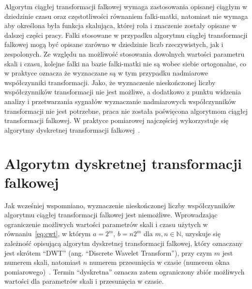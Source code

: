 Algorytm ciągłej transformacji falkowej wymaga zastosowania opisanej ciągłym w dziedzinie czasu oraz częstotliwości równaniem falki-matki, natomiast nie wymaga aby określona była funkcja skalująca, której rola i znaczenie zostały opisane w dalszej części pracy. Falki stosowane w przypadku algorytmu ciągłej transformacji falkowej mogą być opisane zarówno w dziedzinie liczb rzeczywistych, jak i zespolonych. Ze względu na możliwość stosowania dowolnych wartości parametru skali i czasu, kolejne falki na bazie falki-matki nie są wobec siebie ortogonalne, co w praktyce oznacza że wyznaczane są w tym przypadku nadmiarowe współczynniki transformacji. Jako, że wyznaczenie nieskończonej liczby współczynników transformacji nie jest możliwe, a dodatkowo z punktu widzenia analizy i przetwarzania sygnałów wyznaczanie nadmiarowych współczynników transformacji nie jest potrzebne, praca nie została poświęcona algorytmom ciągłej transformacji falkowej. W praktyce pomiarowej najczęściej wykorzystuje się algorytmy dyskretnej transformacji falkowej~\cite{wallen_handbook, akujuobi_applications}.

\section{Algorytm dyskretnej transformacji falkowej}

Jak wcześniej wspomniano, wyznaczenie nieskończonej liczby współczynników algorytmu ciągłej transformacji falkowej jest niemożliwe. Wprowadzając ograniczenie możliwych wartości parametrów skali i czasu użytych w równaniu~\eqref{eq:cwt}, w którym $a = 2^m$, $b = n2^m$ dla $m, n \in \mathbb{N}$, uzyskuje się zależność opisującą algorytm dyskretnej transformacji falkowej, który oznaczany jest skrótem \enquote{DWT} (ang. \enquote{Discrete Wavelet Transform}), przy czym $m$ jest numerem skali, natomiast $n$ numerem przesunięcia w czasie (numerem okna pomiarowego)~\cite{wallen_handbook}. Termin \enquote{dyskretna} oznacza zatem ograniczony zbiór możliwych wartości dla parametrów skali i przesunięcia w czasie.

